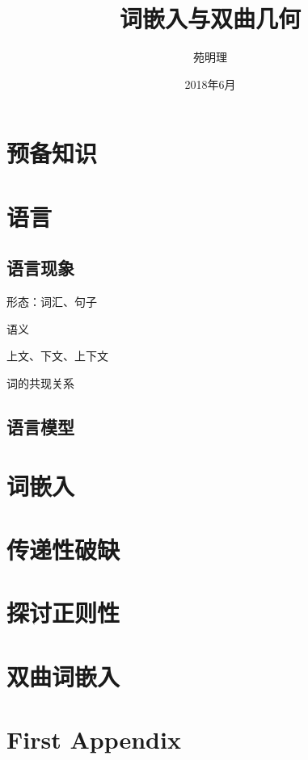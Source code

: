 \documentclass[a4paper,12pt]{article}
\title{词嵌入与双曲几何}
\author{苑明理}
\date{2018年6月}
\begin{document}
\maketitle{}

\renewcommand\contentsname{目录}
\setcounter{tocdepth}{2}
\tableofcontents

\newpage

\section{预备知识}

\section{语言}

\subsection{语言现象}

形态：词汇、句子

语义

上文、下文、上下文

词的共现关系

\subsection{语言模型}

\section{词嵌入}

\section{传递性破缺}

\section{探讨正则性}

\section{双曲词嵌入}

\appendix
\section{First Appendix}
\end{document}
